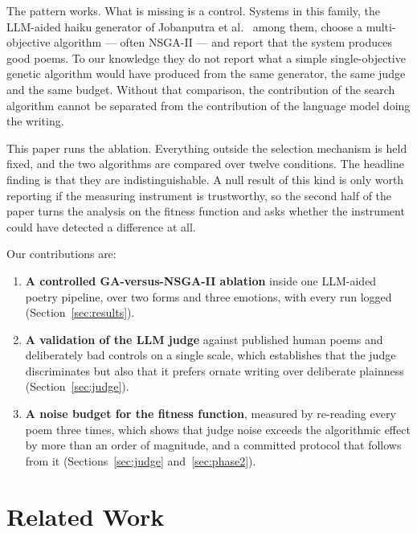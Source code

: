 \documentclass[conference]{IEEEtran}
\begin{document}
The pattern works. What is missing is a control. Systems in this family, the
LLM-aided haiku generator of Jobanputra et al.\ \cite{jobanputra2025} among them,
choose a multi-objective algorithm --- often NSGA-II \cite{deb2002} --- and
report that the system produces good poems. To our knowledge they do not report
what a simple single-objective genetic algorithm would have produced from the same generator,
the same judge and the same budget. Without that comparison, the contribution of
the search algorithm cannot be separated from the contribution of the language
model doing the writing.

This paper runs the ablation. Everything outside the selection mechanism is held
fixed, and the two algorithms are compared over twelve conditions. The headline
finding is that they are indistinguishable. A null result of this kind is only
worth reporting if the measuring instrument is trustworthy, so the second half of
the paper turns the analysis on the fitness function and asks whether the
instrument could have detected a difference at all.

Our contributions are:
\begin{enumerate}
\item \textbf{A controlled GA-versus-NSGA-II ablation} inside one LLM-aided
poetry pipeline, over two forms and three emotions, with every run logged
(Section~\ref{sec:results}).
\item \textbf{A validation of the LLM judge} against published human poems and
deliberately bad controls on a single scale, which establishes that the judge
discriminates but also that it prefers ornate writing over deliberate plainness
(Section~\ref{sec:judge}).
\item \textbf{A noise budget for the fitness function}, measured by re-reading
every poem three times, which shows that judge noise exceeds the algorithmic
effect by more than an order of magnitude, and a committed protocol that
follows from it (Sections~\ref{sec:judge} and~\ref{sec:phase2}).
\end{enumerate}

\section{Related Work}
\end{document}
